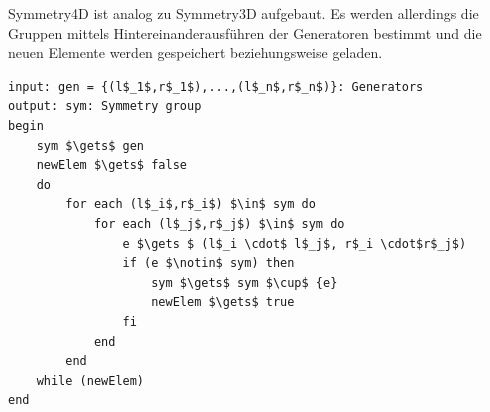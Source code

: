 Symmetry4D ist analog zu Symmetry3D aufgebaut. Es werden allerdings die Gruppen mittels Hintereinanderausführen der Generatoren bestimmt und die neuen Elemente werden gespeichert beziehungsweise geladen.
\begin{lstlisting}[mathescape, morekeywords={for, each, if, then, fi, do, begin,input, output, end, return}, caption={Peusdocode der Symmetriegruppenerzeugung}, label=alg:fromgen]
input: gen = {(l$_1$,r$_1$),...,(l$_n$,r$_n$)}: Generators
output: sym: Symmetry group
begin	
	sym $\gets$ gen
	newElem $\gets$ false
	do
		for each (l$_i$,r$_i$) $\in$ sym do
			for each (l$_j$,r$_j$) $\in$ sym do
				e $\gets $ (l$_i \cdot$ l$_j$, r$_i \cdot$r$_j$)
				if (e $\notin$ sym) then
					sym $\gets$ sym $\cup$ {e}
					newElem $\gets$ true
				fi
			end
		end
	while (newElem)
end 


\end{lstlisting}


